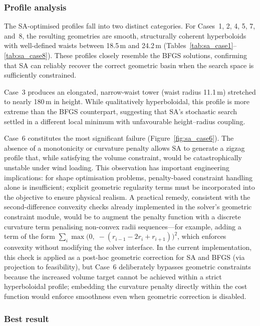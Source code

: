 \subsubsection{Profile analysis}

The SA-optimised profiles fall into two distinct categories. For Cases~1, 2, 4, 5, 7, and~8, the resulting geometries are smooth, structurally coherent hyperboloids with well-defined waists between 18.5\,m and 24.2\,m (Tables~\ref{tab:sa_case1}--\ref{tab:sa_case8}). These profiles closely resemble the BFGS solutions, confirming that SA can reliably recover the correct geometric basin when the search space is sufficiently constrained.

Case~3 produces an elongated, narrow-waist tower (waist radius 11.1\,m) stretched to nearly 180\,m in height. While qualitatively hyperboloidal, this profile is more extreme than the BFGS counterpart, suggesting that SA's stochastic search settled in a different local minimum with unfavourable height--radius coupling.

Case~6 constitutes the most significant failure (Figure~\ref{fig:sa_case6}). The absence of a monotonicity or curvature penalty allows SA to generate a zigzag profile that, while satisfying the volume constraint, would be catastrophically unstable under wind loading. This observation has important engineering implications: for shape optimisation problems, penalty-based constraint handling alone is insufficient; explicit geometric regularity terms must be incorporated into the objective to ensure physical realism. A practical remedy, consistent with the second-difference convexity checks already implemented in the solver's geometric constraint module, would be to augment the penalty function with a discrete curvature term penalising non-convex radii sequences---for example, adding a term of the form $\sum_{i} \max\bigl(0,\; -(r_{i-1} - 2r_i + r_{i+1})\bigr)^2$, which enforces convexity without modifying the solver interface. In the current implementation, this check is applied as a post-hoc geometric correction for SA and BFGS (via projection to feasibility), but Case~6 deliberately bypasses geometric constraints because the increased volume target cannot be achieved within a strict hyperboloidal profile; embedding the curvature penalty directly within the cost function would enforce smoothness even when geometric correction is disabled.

\subsubsection{Best result}

